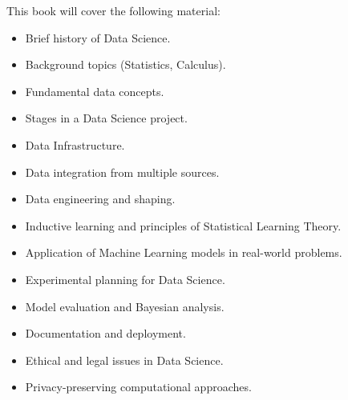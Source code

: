 This book will cover the following material:
\begin{itemize}
  \item Brief history of Data Science.
  \item Background topics (Statistics, Calculus).
  \item Fundamental data concepts.
  \item Stages in a Data Science project.
  \item Data Infrastructure.
  \item Data integration from multiple sources.
  \item Data engineering and shaping.
  \item Inductive learning and principles of Statistical Learning Theory.
  \item Application of Machine Learning models in real-world problems.
  \item Experimental planning for Data Science.
  \item Model evaluation and Bayesian analysis.
  \item Documentation and deployment.
  \item Ethical and legal issues in Data Science.
  \item Privacy-preserving computational approaches.
\end{itemize}
